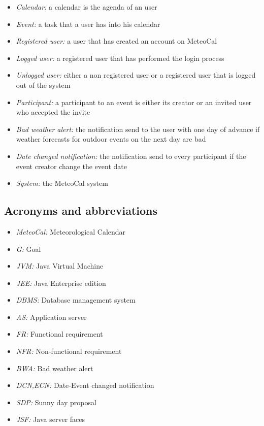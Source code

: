 \documentclass[10pt,a4paper,titlepage]{article}
\begin{document}
\begin{itemize}
\item \emph{Calendar:} a calendar is the agenda of an user
\item \emph{Event:} a task that a user has into his calendar
\item \emph{Registered user:} a user that has created an account on MeteoCal
\item \emph{Logged user:} a registered user that has performed the login process
\item \emph{Unlogged user:} either a non registered user or a registered user that is logged out of the system
\item \emph{Participant:} a participant to an event is either its creator or an invited user who accepted the invite
\item \emph{Bad weather alert:} the notification send to the user with one day of advance if weather forecasts for outdoor events on the next day are bad
\item \emph{Date changed notification:} the notification send to every participant if the event creator change the event date
\item \emph{System:} the MeteoCal system
\end{itemize}

\subsection{Acronyms and abbreviations}
\begin{itemize}
\item \emph{MeteoCal:} Meteorological Calendar
\item \emph{G:} Goal
\item \emph{JVM:} Java Virtual Machine
\item \emph{JEE:} Java Enterprise edition
\item \emph{DBMS:} Database management system
\item \emph{AS:} Application server
\item \emph{FR:} Functional requirement
\item \emph{NFR:} Non-functional requirement
\item \emph{BWA:} Bad weather alert
\item \emph{DCN,ECN:} Date-Event changed notification
\item \emph{SDP:} Sunny day proposal 
\item \emph{JSF:} Java server faces
\end{itemize}
\end{document}
